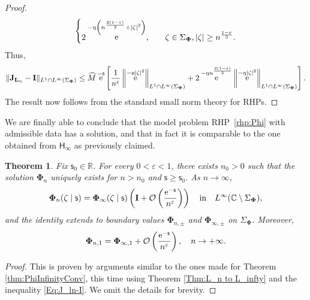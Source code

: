\documentclass[reqno,a4paper,11pt]{amsart}
\DeclareMathOperator{\ee}{\rm e}
\newcommand{\C}{\mathbb{C}}
\newcommand{\R}{\mathbb{R}}
\newcommand{\Boh}{\mathcal{O}}
\renewcommand{\bm}{\mathbf}
\newcommand{\msf}{\mathsf}
\newcommand{\sad}{\msf s}
\newcommand{\uad}{\msf u}
\newtheorem{theorem}{Theorem}[section]
\theoremstyle{definition}
\theoremstyle{remark}
\numberwithin{equation}{section}
\begin{document}
\begin{proof}
\[\begin{dcases}
              2 \ee^{ - \eta \left(n^{\frac{2(1-\varepsilon)}{3} }+ |\zeta|^2 \right)}
            ,\quad &\zeta \in \Sigma_{\bm \Phi}, |\zeta| \geq n^{\frac{1-\varepsilon}{3}}. \\
        \end{dcases}
    \]
    Thus,
    \begin{equation} \label{Eq:J_ln-I}
        \| \bm J_{\bm L_n} - \bm I \|_{L^1\cap L^\infty(\Sigma_{\bm \Phi})}
            \leq \widehat M \ee^{- \sad } \left[\frac{1}{n^\varepsilon} 
            \left\| \ee^{ - \uad |\zeta|^2} \right\|_{L^1\cap L^\infty(\Sigma_{\bm \Phi})} +
            2 \ee^{- \eta n^{\frac{2(1-\varepsilon)}{3}}} \left\| \ee^{- \eta |\zeta|^2} \right\|_{L^1\cap L^\infty(\Sigma_{\bm \Phi})}
            \right] 
        . 
    \end{equation}
The result now follows from the standard small norm theory for RHPs.
\end{proof}

We are finally able to conclude that the model problem RHP~\ref{rhp:Phi} with admissible data has a solution, and that in fact it is comparable to the one obtained from $\msf H_\infty$ as previously claimed.

\begin{theorem}\label{thm:PhinPhiinfty}
    Fix $\sad_0 \in \R$. For every $0 < \varepsilon < 1$, there exists $n_0 > 0$ such that the solution $\bm \Phi_n$ uniquely exists for $n > n_0$ and $\sad \geq \sad_0$. As $n \to \infty$,
    \begin{equation}\label{eq:asymptotics_phi_n}
        \bm \Phi_n(\zeta \mid \sad) = \bm \Phi_\infty(\zeta \mid \sad) \left( \bm I  + \Boh\left( \frac{\ee^{- \sad}}{n^{\varepsilon}} \right) \right)
        \quad\text{in}\quad L^\infty(\C \setminus \Sigma_{\bm \Phi}),
    \end{equation}
    and the identity extends to boundary values $\bm \Phi_{n,\pm}$ and $\bm \Phi_{\infty,\pm}$ on $\Sigma_{\bm \Phi}$. Moreover,
    \begin{equation} \label{eq:asumptotics_phi_n_1}
        \bm \Phi_{n,1} = \bm \Phi_{\infty,1} + \Boh\left(\frac{\ee^{-\sad}}{n^\varepsilon}\right), \quad n \to +\infty.
    \end{equation}
\end{theorem}

\begin{proof}
    This is proven by arguments similar to the ones made for Theorem \ref{thm:PhiInfinityConv}, this time using Theorem \ref{Thm:L_n to L_infty} and the inequality \eqref{Eq:J_ln-I}. We omit the details for brevity. 
\end{proof}
\end{document}

